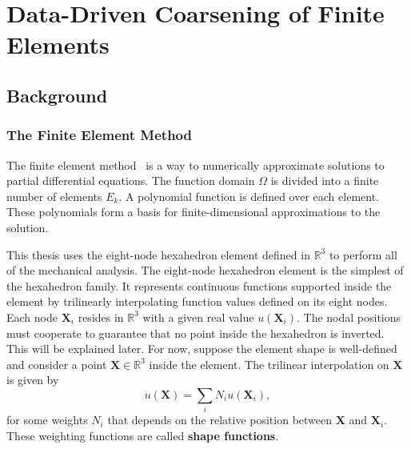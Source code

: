 \chapter{Data-Driven Coarsening of Finite Elements}
\section{Background}
\subsection{The Finite Element Method}
The finite element method~\citep{ciarlet2002finite} is a way to numerically approximate solutions to partial differential equations.
The function domain $\Omega$ is divided into a finite number of elements $E_k$.
A polynomial function is defined over each element.
These polynomials form a basis for finite-dimensional approximations to the solution.

This thesis uses the eight-node hexahedron element defined in $\mathbb{R}^3$
to perform all of the mechanical analysis.
The eight-node hexahedron element is the simplest of the hexahedron family.
It represents continuous functions supported inside the element by trilinearly interpolating function values defined on its eight nodes.
Each node $\mathbf{X}_i$ resides in $\mathbb{R}^3$ with a given real value $u(\mathbf{X}_i)$.
The nodal positions must cooperate to guarantee that no point inside the hexahedron is inverted.
This will be explained later.
For now, suppose the element shape is well-defined and 
consider a point $\mathbf{X}\in\mathbb{R}^3$ inside the element.
The trilinear interpolation on $\mathbf{X}$ is given by
\[
u(\mathbf{X})=\sum_i N_iu(\mathbf{X}_i),
\]
for some weights $N_i$ that depends on the relative position between $\mathbf{X}$ 
and $\mathbf{X}_i$. These weighting functions are called \textbf{shape functions}.

